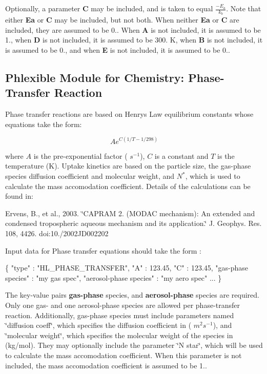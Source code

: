 Optionally, a parameter {\bfseries C} may be included, and is taken to equal $\frac{-E_a}{k_b}$. Note that either {\bfseries Ea} or {\bfseries C} may be included, but not both. When neither {\bfseries Ea} or {\bfseries C} are included, they are assumed to be 0.. When {\bfseries A} is not included, it is assumed to be 1., when {\bfseries D} is not included, it is assumed to be 300. K, when {\bfseries B} is not included, it is assumed to be 0., and when {\bfseries E} is not included, it is assumed to be 0.. \hypertarget{phlex_rxn_HL_phase_transfer}{}\subsection{Phlexible Module for Chemistry\+: Phase-\/\+Transfer Reaction}\label{phlex_rxn_HL_phase_transfer}
Phase transfer reactions are based on Henry\textquotesingle{}s Law equilibrium constants whose equations take the form\+:

\[ Ae^{C({1/T-1/298})} \]

where $A$ is the pre-\/exponential factor ( $s^{-1}$), $C$ is a constant and $T$ is the temperature (K). Uptake kinetics are based on the particle size, the gas-\/phase species diffusion coefficient and molecular weight, and $N^{*}$, which is used to calculate the mass accomodation coefficient. Details of the calculations can be found in\+:

Ervens, B., et al., 2003. \char`\"{}\+C\+A\+P\+R\+A\+M 2. (\+M\+O\+D\+A\+C mechanism)\+: An extended
 and condensed tropospheric aqueous mechanism and its application.\char`\"{} J. Geophys. Res. 108, 4426. doi\+:10./2002\+J\+D002202

Input data for Phase transfer equations should take the form \+: 
\begin{DoxyCode}
\{
  "type" : "HL\_PHASE\_TRANSFER",
  "A" : 123.45,
  "C" : 123.45,
  "gas-phase species" : "my gas spec",
  "aerosol-phase species" : "my aero spec"
    ...
\}
\end{DoxyCode}
 The key-\/value pairs {\bfseries gas-\/phase} species, and {\bfseries aerosol-\/phase} species are required. Only one gas-\/ and one aerosol-\/phase species are allowed per phase-\/transfer reaction. Additionally, gas-\/phase species must include parameters named \char`\"{}diffusion coeff\char`\"{}, which specifies the diffusion coefficient in ( $m^2s^{-1}$), and \char`\"{}molecular weight\char`\"{}, which specifies the molecular weight of the species in (kg/mol). They may optionally include the parameter \char`\"{}\+N star\char`\"{}, which will be used to calculate the mass accomodation coefficient. When this parameter is not included, the mass accomodation coefficient is assumed to be 1..

